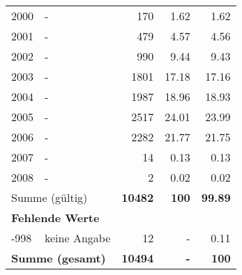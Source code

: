 \begin{longtable}{lXrrr}
        2000 & \multicolumn{1}{X}{-} & %
          \num{170} &
          \num[round-mode=places,round-precision=2]{1.62} &
          \num[round-mode=places,round-precision=2]{1.62} \\

        2001 & \multicolumn{1}{X}{-} & %
          \num{479} &
          \num[round-mode=places,round-precision=2]{4.57} &
          \num[round-mode=places,round-precision=2]{4.56} \\

        2002 & \multicolumn{1}{X}{-} & %
          \num{990} &
          \num[round-mode=places,round-precision=2]{9.44} &
          \num[round-mode=places,round-precision=2]{9.43} \\

        2003 & \multicolumn{1}{X}{-} & %
          \num{1801} &
          \num[round-mode=places,round-precision=2]{17.18} &
          \num[round-mode=places,round-precision=2]{17.16} \\

        2004 & \multicolumn{1}{X}{-} & %
          \num{1987} &
          \num[round-mode=places,round-precision=2]{18.96} &
          \num[round-mode=places,round-precision=2]{18.93} \\

        2005 & \multicolumn{1}{X}{-} & %
          \num{2517} &
          \num[round-mode=places,round-precision=2]{24.01} &
          \num[round-mode=places,round-precision=2]{23.99} \\

        2006 & \multicolumn{1}{X}{-} & %
          \num{2282} &
          \num[round-mode=places,round-precision=2]{21.77} &
          \num[round-mode=places,round-precision=2]{21.75} \\

        2007 & \multicolumn{1}{X}{-} & %
          \num{14} &
          \num[round-mode=places,round-precision=2]{0.13} &
          \num[round-mode=places,round-precision=2]{0.13} \\

        2008 & \multicolumn{1}{X}{-} & %
          \num{2} &
          \num[round-mode=places,round-precision=2]{0.02} &
          \num[round-mode=places,round-precision=2]{0.02} \\

     \midrule
     \multicolumn{2}{l}{Summe (gültig)} &
       \textbf{\num{10482}} &
     \textbf{\num{100}} &
       \textbf{\num[round-mode=places,round-precision=2]{99.89}} \\
     \multicolumn{5}{l}{\textbf{Fehlende Werte}}\\
       -998 &
       keine Angabe &
         \num{12} &
        - &
         \num[round-mode=places,round-precision=2]{0.11} \\
     \midrule
     \multicolumn{2}{l}{\textbf{Summe (gesamt)}} &
          \textbf{\num{10494}} &
        \textbf{-} &
        \textbf{\num{100}} \\
     \bottomrule
     \end{longtable}
     
